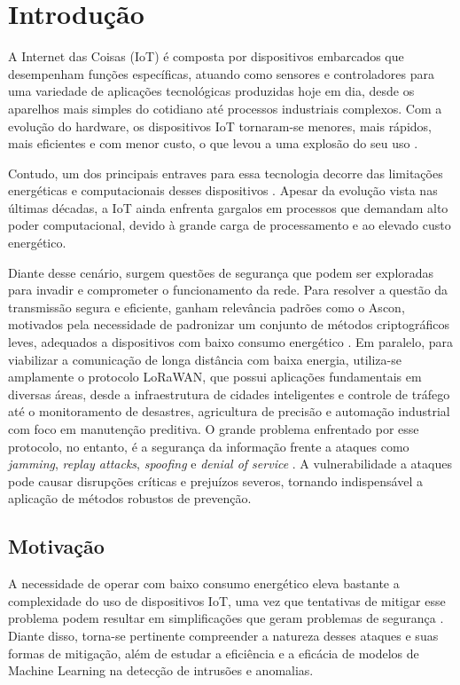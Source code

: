 \chapter{Introdução} \label{cap:introducao}

A Internet das Coisas (IoT) é composta por dispositivos embarcados que desempenham funções específicas, atuando como sensores e controladores para uma variedade de aplicações tecnológicas produzidas hoje em dia, desde os aparelhos mais simples do cotidiano até processos industriais complexos. Com a evolução do hardware, os dispositivos IoT tornaram-se menores, mais rápidos, mais eficientes e com menor custo, o que levou a uma explosão do seu uso \cite{alfuqaha2015iot}.

Contudo, um dos principais entraves para essa tecnologia decorre das limitações energéticas e computacionais desses dispositivos \cite{nistir8114}. Apesar da evolução vista nas últimas décadas, a IoT ainda enfrenta gargalos em processos que demandam alto poder computacional, devido à grande carga de processamento e ao elevado custo energético.

Diante desse cenário, surgem questões de segurança que podem ser exploradas para invadir e comprometer o funcionamento da rede. Para resolver a questão da transmissão segura e eficiente, ganham relevância padrões como o Ascon, motivados pela necessidade de padronizar um conjunto de métodos criptográficos leves, adequados a dispositivos com baixo consumo energético \cite{nist800232}. Em paralelo, para viabilizar a comunicação de longa distância com baixa energia, utiliza-se amplamente o protocolo LoRaWAN, que possui aplicações fundamentais em diversas áreas, desde a infraestrutura de cidades inteligentes e controle de tráfego até o monitoramento de desastres, agricultura de precisão e automação industrial com foco em manutenção preditiva. O grande problema enfrentado por esse protocolo, no entanto, é a segurança da informação frente a ataques como \textit{jamming}, \textit{replay attacks}, \textit{spoofing} e \textit{denial of service} \cite{hessel2023lorawan}. A vulnerabilidade a ataques pode causar disrupções críticas e prejuízos severos, tornando indispensável a aplicação de métodos robustos de prevenção. 


\section{Motivação}
A necessidade de operar com baixo consumo energético eleva bastante a complexidade do uso de dispositivos IoT, uma vez que tentativas de mitigar esse problema podem resultar em simplificações que geram problemas de segurança \cite{nistir8114, hessel2023lorawan}. Diante disso, torna-se pertinente compreender a natureza desses ataques e suas formas de mitigação, além de estudar a eficiência e a eficácia de modelos de Machine Learning na detecção de intrusões e anomalias.

